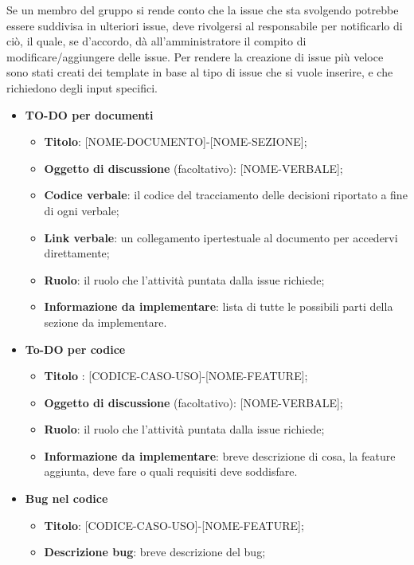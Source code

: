 Se un membro del gruppo si rende conto che la issue che sta
svolgendo potrebbe essere suddivisa in ulteriori issue, deve rivolgersi al
responsabile per notificarlo di ciò, il quale, se d'accordo, dà all'amministratore
il compito di modificare/aggiungere delle issue. Per rendere la
creazione di issue più veloce sono stati creati dei template in base al tipo di
issue che si vuole inserire, e che richiedono degli input specifici.
\begin{itemize}
    \item  \textbf{TO-DO per documenti}
          \begin{itemize}
              \item \textbf{Titolo}: [NOME-DOCUMENTO]-[NOME-SEZIONE];
              \item \textbf{Oggetto di discussione} (facoltativo): [NOME-VERBALE];
              \item \textbf{Codice verbale}: il codice del tracciamento delle decisioni riportato a fine di ogni verbale;
              \item \textbf{Link verbale}: un collegamento ipertestuale al documento per accedervi direttamente;
              \item \textbf{Ruolo}: il ruolo che l'attività puntata dalla issue richiede;
              \item \textbf{Informazione da implementare}: lista di tutte le possibili parti della sezione da implementare.
          \end{itemize}
    \item  \textbf{To-DO per codice}
          \begin{itemize}
              \item \textbf{Titolo} : [CODICE-CASO-USO]-[NOME-FEATURE];
              \item \textbf{Oggetto di discussione} (facoltativo): [NOME-VERBALE];
              \item \textbf{Ruolo}: il ruolo che l'attività puntata dalla issue richiede;
              \item \textbf{Informazione da implementare}: breve descrizione di cosa, la feature aggiunta, deve fare o quali requisiti deve soddisfare.
          \end{itemize}
    \item  \textbf{Bug nel codice}
          \begin{itemize}
              \item \textbf{Titolo}: [CODICE-CASO-USO]-[NOME-FEATURE];
              \item \textbf{Descrizione bug}: breve descrizione del bug;

\end{itemize}
\end{itemize}
